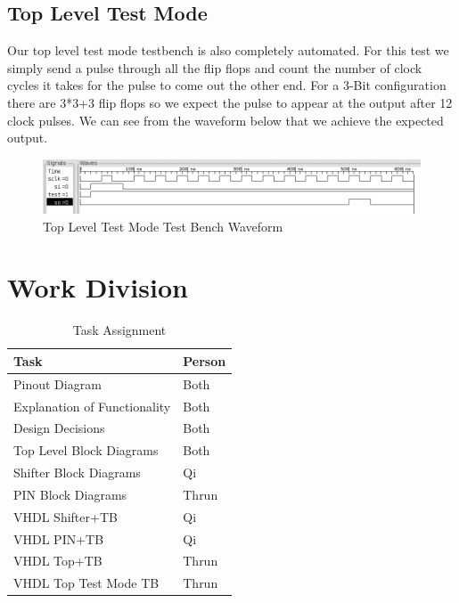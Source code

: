     \subsection{Top Level Test Mode}
        Our top level test mode testbench is also completely automated. For
        this test we simply send a pulse through all the flip flops and count
        the number of clock cycles it takes for the pulse to come out the other
        end. For a 3-Bit configuration there are 3*3+3 flip flops so we expect
        the pulse to appear at the output after 12 clock pulses. We can see
        from the waveform below that we achieve the expected output.
        \begin{figure}[H]
            \centering
            \includegraphics[width=\linewidth]{../../doc/vhdl_sim_pics/top_test.png}
            \caption{Top Level Test Mode Test Bench Waveform}
        \end{figure}

\section{Work Division}

\begin{table}[H]
    \centering
    \begin{tabular}{ll}
        \toprule
        \textbf{Task} & \textbf{Person}\\
        \midrule
        Pinout Diagram & Both \\
        Explanation of Functionality & Both \\
        Design Decisions & Both \\
        Top Level Block Diagrams & Both \\
        Shifter Block Diagrams & Qi \\
        PIN Block Diagrams & Thrun \\
        VHDL Shifter+TB & Qi \\
        VHDL PIN+TB & Qi \\
        VHDL Top+TB & Thrun \\
        VHDL Top Test Mode TB & Thrun \\
        \bottomrule
    \end{tabular}
    \caption{Task Assignment}
\end{table}


